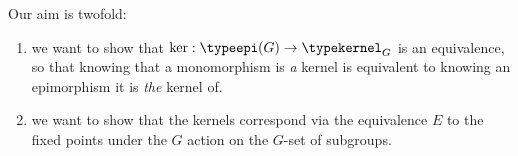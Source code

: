   Our aim is twofold:
  \begin{enumerate}
  \item we want to show that $\ker:\typeepi(G)\to\typekernel_G$ is an equivalence, so that knowing that a monomorphism is \emph{a} kernel is equivalent to knowing an epimorphism it is \emph{the} kernel of.
  \item we want to show that the kernels correspond via the equivalence $E$ to the fixed points under the $G$ action on the $G$-set of subgroups.
  \end{enumerate}





